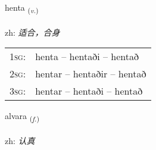 \documentclass[frontgrid, backgrid]{flacards}\usepackage[]{graphicx}\usepackage[]{color}
\begin{document}
\renewcommand{\flhead}{\vskip5pt \fboxsep=0pt {\small\bfseries\footnotesize Sagnorð | 动词}}
\renewcommand{\fcfoot}{\vskip5pt \fboxsep=0pt \hspace{2pt}{\small\bfseries\footnotesize 2K}}

\renewcommand{\blhead}{\vskip5pt {\small\bfseries\footnotesize Sagnorð | 动词 }}
\renewcommand{\bcfoot}{\vskip5pt \hspace{2pt}{\small\bfseries\footnotesize 2K}}


{henta \small{\textsubscript{(\textit{v.})}} \\[1ex] %
\textphonetic{[hɛn̥ta]} \\
zh: \emph{适合，合身} \\  [2ex]
\renewcommand*{\arraystretch}{0.8}
\begin{tabular}{p{1cm}l}
\textsc{1sg}: & henta -- hentaði -- hentað \\ 
\textsc{2sg}: & hentar -- hentaðir -- hentað \\ 
\textsc{3sg}: & hentar -- hentaði -- hentað \\ 
\end{tabular}
}

\renewcommand{\flhead}{\vskip5pt \fboxsep=0pt {\small\bfseries\footnotesize Nafnorð | 名词}}
\renewcommand{\fcfoot}{\vskip5pt \fboxsep=0pt \hspace{2pt}{\small\bfseries\footnotesize 2K}}

\renewcommand{\blhead}{\vskip5pt {\small\bfseries\footnotesize Nafnorð | 名词 }}
\renewcommand{\bcfoot}{\vskip5pt \hspace{2pt}{\small\bfseries\footnotesize 2K}}


{alvara \small{\textsubscript{(\textit{f.})}} \\[1ex] %
\textphonetic{[alvara]} \\
zh: \emph{认真} \\  [2ex]
\renewcommand*{\arraystretch}{0.8}
}
\end{document}
